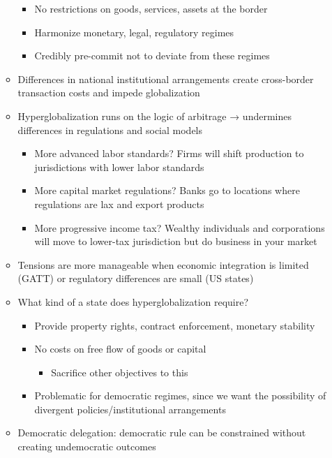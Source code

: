 \begin{itemize}
\begin{itemize}
    \begin{itemize}
    \tightlist
    \item
      No restrictions on goods, services, assets at the border
    \item
      Harmonize monetary, legal, regulatory regimes
    \item
      Credibly pre-commit not to deviate from these regimes
    \end{itemize}
  \item
    Differences in national institutional arrangements create
    cross-border transaction costs and impede globalization
  \item
    Hyperglobalization runs on the logic of arbitrage → undermines
    differences in regulations and social models

    \begin{itemize}
    \tightlist
    \item
      More advanced labor standards? Firms will shift production to
      jurisdictions with lower labor standards
    \item
      More capital market regulations? Banks go to locations where
      regulations are lax and export products
    \item
      More progressive income tax? Wealthy individuals and corporations
      will move to lower-tax jurisdiction but do business in your market
    \end{itemize}
  \item
    Tensions are more manageable when economic integration is limited
    (GATT) or regulatory differences are small (US states)
  \item
    What kind of a state does hyperglobalization require?

    \begin{itemize}
    \tightlist
    \item
      Provide property rights, contract enforcement, monetary stability
    \item
      No costs on free flow of goods or capital

      \begin{itemize}
      \tightlist
      \item
        Sacrifice other objectives to this
      \end{itemize}
    \item
      Problematic for democratic regimes, since we want the possibility
      of divergent policies/institutional arrangements
    \end{itemize}
  \item
    Democratic delegation: democratic rule can be constrained without
    creating undemocratic outcomes


\end{itemize}
\end{itemize}
